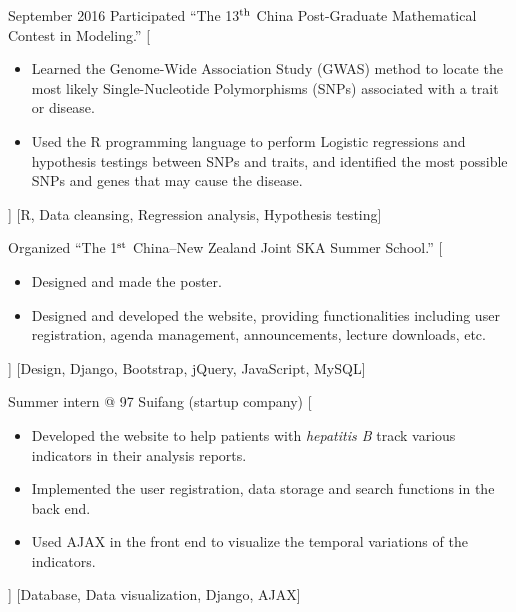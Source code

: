 \documentclass{resume}
\begin{document}
\begin{experiences}



  \separator{0.5em}
  \experience
    {September 2016}%
    {Participated
      \enquote{The 13$^{\rm th}$ China Post-Graduate Mathematical
        Contest in Modeling.}}%
    [\begin{itemize}
      \item Learned the Genome-Wide Association Study (GWAS) method
        to locate the most likely Single-Nucleotide Polymorphisms (SNPs)
        associated with a trait or disease.
      \item Used the R programming language to perform Logistic regressions
        and hypothesis testings between SNPs and traits, and
        identified the most possible SNPs and genes that may cause the
        disease.
    \end{itemize}]%
    [R, Data cleansing, Regression analysis, Hypothesis testing]

  \separator{0.5em}
    {Organized
      \enquote{The 1$^{\rm st}$ China--New Zealand Joint SKA Summer School.}}%
    [\begin{itemize}
      \item Designed and made the poster.
      \item Designed and developed the website,
        providing functionalities including user registration,
        agenda management, announcements, lecture downloads, etc.
    \end{itemize}]%
    [Design, Django, Bootstrap, jQuery, JavaScript, MySQL]

  \separator{0.5em}
    {Summer intern @ 97 Suifang (startup company)}%
    [\begin{itemize}
      \item Developed the website to help patients with \textit{hepatitis B}
        track various indicators in their analysis reports.
      \item Implemented the user registration, data storage and search
        functions in the back end.
      \item Used AJAX in the front end to visualize the temporal variations
        of the indicators.
    \end{itemize}]%
    [Database, Data visualization, Django, AJAX]


\end{experiences}
\end{document}
